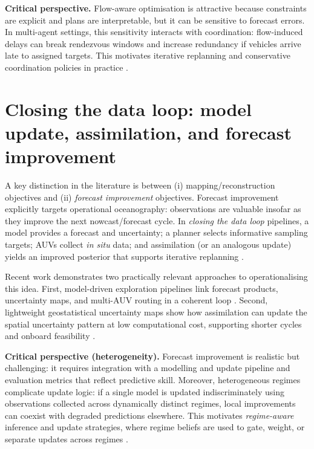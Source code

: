 \textbf{Critical perspective.} Flow-aware optimisation is attractive because constraints are explicit and plans are interpretable, but it can be sensitive to forecast errors.
In multi-agent settings, this sensitivity interacts with coordination: flow-induced delays can break rendezvous windows and increase redundancy if vehicles arrive late to assigned targets.
This motivates iterative replanning and conservative coordination policies in practice \parencite{hwang2019auvreview}.

\section{Closing the data loop: model update, assimilation, and forecast improvement} \label{sec:closing_loop}

A key distinction in the literature is between (i) mapping/reconstruction objectives and (ii) \emph{forecast improvement} objectives.
Forecast improvement explicitly targets operational oceanography: observations are valuable insofar as they improve the next nowcast/forecast cycle.
In \emph{closing the data loop} pipelines, a model provides a forecast and uncertainty; a planner selects informative sampling targets; AUVs collect \emph{in situ} data; and assimilation (or an analogous update) yields an improved posterior that supports iterative replanning
\parencite{bernacchi2025closingloop,lermusiaux2007adaptive}.

Recent work demonstrates two practically relevant approaches to operationalising this idea.
First, model-driven exploration pipelines link forecast products, uncertainty maps, and multi-AUV routing in a coherent loop \parencite{mendes2025oceanmodeldriven,bernacchi2025closingloop}.
Second, lightweight geostatistical uncertainty maps show how assimilation can update the spatial uncertainty pattern at low computational cost, supporting shorter cycles and onboard feasibility \parencite{duarte2025geostatistical}.

\textbf{Critical perspective (heterogeneity).}
Forecast improvement is realistic but challenging: it requires integration with a modelling and update pipeline and evaluation metrics that reflect predictive skill.
Moreover, heterogeneous regimes complicate update logic: if a single model is updated indiscriminately using observations collected across dynamically distinct regimes, local improvements can coexist with degraded predictions elsewhere.
This motivates \emph{regime-aware} inference and update strategies, where regime beliefs are used to gate, weight, or separate updates across regimes
\parencite{fossum2020compact,ge2023watermasses,bernacchi2025closingloop}.

